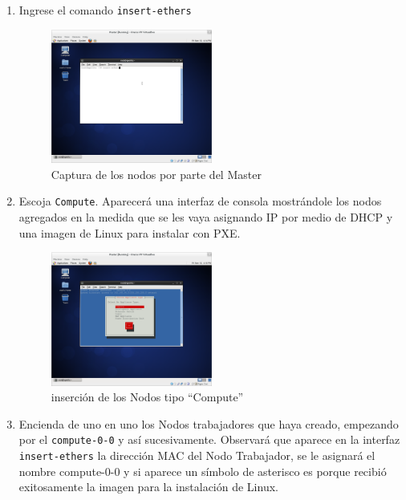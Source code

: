 \begin{enumerate}
\item Ingrese el comando \texttt{insert-ethers}



\begin{figure}[H]
	\centering
	\includegraphics[width=0.5\textwidth]{aux/insert}
	\caption{Captura de los nodos por parte del Master}
\end{figure}



\item Escoja \texttt{Compute}. Aparecerá una interfaz de consola mostrándole los nodos agregados en la medida que se les vaya asignando IP por medio de DHCP y una imagen de Linux para instalar con PXE.



\begin{figure}[H]
	\centering
	\includegraphics[width=0.5\textwidth]{aux/compute}
	\caption{inserción de los Nodos tipo ``Compute''}
\end{figure}



\item Encienda de uno en uno los Nodos trabajadores que haya creado, empezando por el \texttt{compute-0-0} y así sucesivamente. Observará que aparece en la interfaz \texttt{insert-ethers} la dirección MAC del Nodo Trabajador, se le asignará el nombre compute-0-0 y si aparece un símbolo de asterisco es porque recibió exitosamente la imagen para la instalación de Linux.





\end{enumerate}
